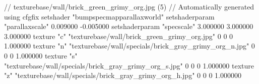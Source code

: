 // texturebase/wall/brick_green_grimy_org.jpg (5)
// Automatically generated using cfgfix
setshader "bumpspecmapparallaxworld"
setshaderparam "parallaxscale" 0.009000 -0.005000
setshaderparam "specscale" 3.000000 3.000000 3.000000
texture "c" "texturebase/wall/brick_green_grimy_org.jpg" 0 0 0 1.000000
texture "n" "texturebase/wall/specials/brick_gray_grimy_org_n.jpg" 0 0 0 1.000000
texture "s" "texturebase/wall/specials/brick_gray_grimy_org_s.jpg" 0 0 0 1.000000
texture "z" "texturebase/wall/specials/brick_gray_grimy_org_h.jpg" 0 0 0 1.000000
